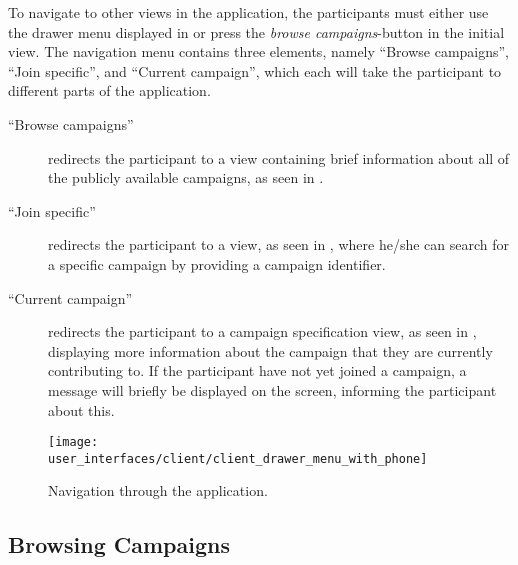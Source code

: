 To navigate to other views in the application, the participants must either use the drawer menu displayed in  or press the \emph{browse campaigns}-button in the initial view. The navigation menu contains three elements, namely ``Browse campaigns'', ``Join specific'', and ``Current campaign'', which each will take the participant to different parts of the application.

\begin{description}
    \item[``Browse campaigns''] redirects the participant to a view containing brief information about all of the publicly available campaigns, as seen in .

    \item[``Join specific''] redirects the participant to a view, as seen in , where he/she can search for a specific campaign by providing a campaign identifier.

    \item[``Current campaign''] redirects the participant to a campaign specification view, as seen in , displaying more information about the campaign that they are currently contributing to. If the participant have not yet joined a campaign, a message will briefly be displayed on the screen, informing the participant about this.
\end{description}

\begin{figure}[!htbp]
    \centering
    \texttt{[image: user\_interfaces/client/client\_drawer\_menu\_with\_phone]}
    \caption{Navigation through the application.}
    \label{fig:navigation}
\end{figure}
\FloatBarrier

\subsection{Browsing Campaigns}
\label{sub:browsing_campaigns}

